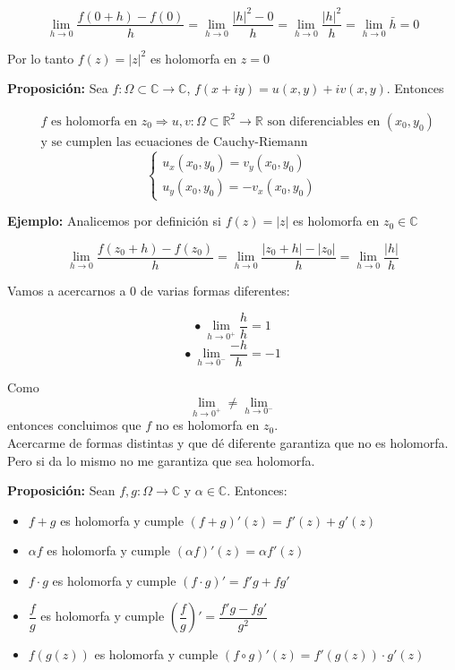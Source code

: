 \documentclass[a4paper,12pt]{article}
\begin{document}
\[
\lim_{h \to 0} \frac{f(0 + h) - f(0)}{h} = \lim_{h \to 0} \frac{|h|^2 - 0}{h} = \lim_{h \to 0} \frac{|h|^2}{h} = \lim_{h \to 0} \bar{h} = 0
\]

Por lo tanto $f(z) = |z|^2$ es holomorfa en $z = 0$

\textbf{Proposición:} Sea $f: \Omega \subset \mathbb{C} \rightarrow \mathbb{C}$, $f(x + iy) = u(x, y) + i v(x, y)$. Entonces

\[
\begin{aligned}
& f \text{ es holomorfa en } z_0 \Rightarrow u, v : \Omega \subset \mathbb{R}^2 \to \mathbb{R} \text{ son diferenciables en } (x_0, y_0) \\
& \text{y se cumplen las ecuaciones de Cauchy-Riemann}
\end{aligned}
\]
\[
\begin{cases}
u_x(x_0, y_0) = v_y(x_0, y_0) \\
u_y(x_0, y_0) = -v_x(x_0, y_0)
\end{cases}
\]

\noindent\textbf{Ejemplo:} Analicemos por definición si $f(z) = |z|$ es holomorfa en $z_0 \in \mathbb{C}$

\[
\lim_{h \to 0} \frac{f(z_0 + h) - f(z_0)}{h} = \lim_{h \to 0} \frac{|z_0 + h| - |z_0|}{h} = \lim_{h \to 0} \frac{|h|}{h}
\]

Vamos a acercarnos a $0$ de varias formas diferentes:

\[
\bullet \ \lim_{h \to 0^+} \frac{h}{h} = 1
\]
\[
\bullet \ \lim_{h \to 0^-} \frac{-h}{h} = -1
\]

Como 
\[
\lim_{h \to 0^+} \neq \lim_{h \to 0^-}
\]
entonces concluimos que $f$ no es holomorfa en $z_0$.\\

Acercarme de formas distintas y que dé diferente garantiza que no es holomorfa.  
Pero si da lo mismo no me garantiza que sea holomorfa.

\textbf{Proposición:} Sean $f, g : \Omega \rightarrow \mathbb{C}$ y $\alpha \in \mathbb{C}$. Entonces:

\begin{itemize}
    \item $f + g$ es holomorfa y cumple $(f + g)'(z) = f'(z) + g'(z)$
    \item $\alpha f$ es holomorfa y cumple $(\alpha f)'(z) = \alpha f'(z)$
    \item $f \cdot g$ es holomorfa y cumple $(f \cdot g)' = f' g + f g'$
    \item $\dfrac{f}{g}$ es holomorfa y cumple $\left(\dfrac{f}{g}\right)' = \dfrac{f' g - f g'}{g^2}$
    \item $f(g(z))$ es holomorfa y cumple $(f \circ g)'(z) = f'(g(z)) \cdot g'(z)$
\end{itemize}
\end{document}
